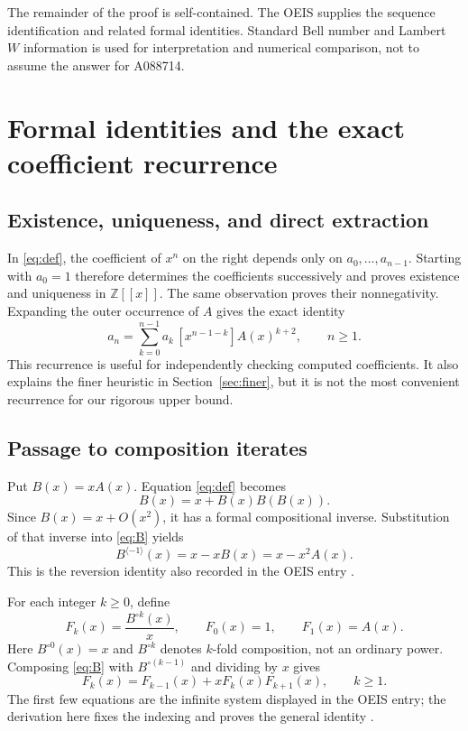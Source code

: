 \documentclass[11pt]{article}
\numberwithin{equation}{section}
\theoremstyle{definition}
\theoremstyle{remark}
\begin{document}
The remainder of the proof is self-contained. The OEIS supplies the
sequence identification and related formal identities. Standard Bell
number and Lambert $W$ information is used for interpretation and
numerical comparison, not to assume the answer for A088714.

\section{Formal identities and the exact coefficient recurrence}

\subsection{Existence, uniqueness, and direct extraction}

In \eqref{eq:def}, the coefficient of $x^n$ on the right depends only on
$a_0,\ldots,a_{n-1}$. Starting with $a_0=1$ therefore determines the
coefficients successively and proves existence and uniqueness in
$\mathbb Z[[x]]$. The same observation proves their nonnegativity.
Expanding the outer occurrence of $A$ gives the exact identity
\begin{equation}\label{eq:directrec}
 a_n=\sum_{k=0}^{n-1}a_k\,[x^{n-1-k}]A(x)^{k+2},\qquad n\ge1.
\end{equation}
This recurrence is useful for independently checking computed
coefficients. It also explains the finer heuristic in
Section~\ref{sec:finer}, but it is not the most convenient recurrence for
our rigorous upper bound.

\subsection{Passage to composition iterates}

Put $B(x)=xA(x)$. Equation \eqref{eq:def} becomes
\begin{equation}\label{eq:B}
 B(x)=x+B(x)B(B(x)).
\end{equation}
Since $B(x)=x+O(x^2)$, it has a formal compositional inverse. Substitution
of that inverse into \eqref{eq:B} yields
\begin{equation}\label{eq:inverse}
 B^{\langle-1\rangle}(x)=x-xB(x)=x-x^2A(x).
\end{equation}
This is the reversion identity also recorded in the OEIS entry
\cite{oeis-a088714}.

For each integer $k\ge0$, define
\begin{equation}\label{eq:Fk}
 F_k(x)=\frac{B^{\circ k}(x)}x,
 \qquad F_0(x)=1,
 \qquad F_1(x)=A(x).
\end{equation}
Here $B^{\circ0}(x)=x$ and $B^{\circ k}$ denotes $k$-fold composition,
not an ordinary power. Composing \eqref{eq:B} with $B^{\circ(k-1)}$ and
dividing by $x$ gives
\begin{equation}\label{eq:hierarchy}
 F_k(x)=F_{k-1}(x)+xF_k(x)F_{k+1}(x),\qquad k\ge1.
\end{equation}
The first few equations are the infinite system displayed in the OEIS
entry; the derivation here fixes the indexing and proves the general
identity \cite{oeis-a088714}.
\end{document}
